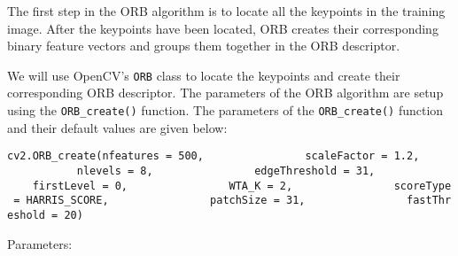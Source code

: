 \documentclass[11pt]{article}
\begin{document}
The first step in the ORB algorithm is to locate all the keypoints in
the training image. After the keypoints have been located, ORB creates
their corresponding binary feature vectors and groups them together in
the ORB descriptor.

We will use OpenCV's \texttt{ORB} class to locate the keypoints and
create their corresponding ORB descriptor. The parameters of the ORB
algorithm are setup using the \texttt{ORB\_create()} function. The
parameters of the \texttt{ORB\_create()} function and their default
values are given below:

\texttt{cv2.ORB\_create(nfeatures\ =\ 500,\ \ \ \ \ \ \ \ \ \ \ \ \ \ \ \ scaleFactor\ =\ 1.2,\ \ \ \ \ \ \ \ \ \ \ \ \ \ \ \ nlevels\ =\ 8,\ \ \ \ \ \ \ \ \ \ \ \ \ \ \ \ edgeThreshold\ =\ 31,\ \ \ \ \ \ \ \ \ \ \ \ \ \ \ \ firstLevel\ =\ 0,\ \ \ \ \ \ \ \ \ \ \ \ \ \ \ \ WTA\_K\ =\ 2,\ \ \ \ \ \ \ \ \ \ \ \ \ \ \ \ scoreType\ =\ HARRIS\_SCORE,\ \ \ \ \ \ \ \ \ \ \ \ \ \ \ \ patchSize\ =\ 31,\ \ \ \ \ \ \ \ \ \ \ \ \ \ \ \ fastThreshold\ =\ 20)}

Parameters:
\end{document}
